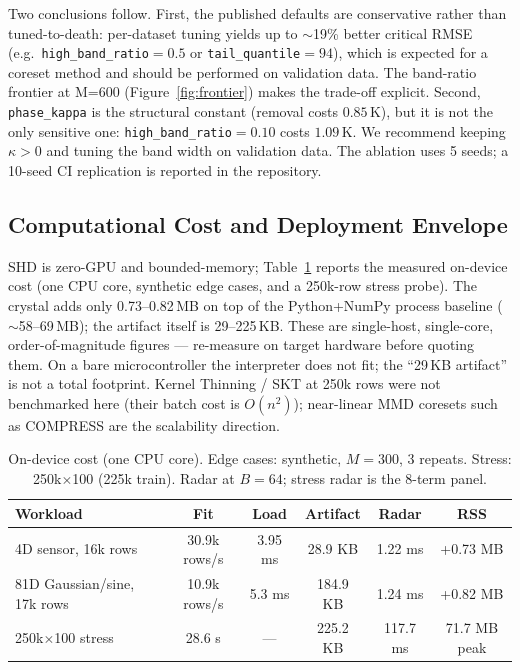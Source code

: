 \documentclass[11pt,a4paper]{article}
\begin{document}
Two conclusions follow. First, the published defaults are conservative rather than
tuned-to-death: per-dataset tuning yields up to $\sim$19\% better critical RMSE
(e.g.\ \texttt{high\_band\_ratio}${=}0.5$ or \texttt{tail\_quantile}${=}94$), which
is expected for a coreset method and should be performed on validation data.
The band-ratio frontier at M=600 (Figure~\ref{fig:frontier}) makes the trade-off explicit.
Second, \texttt{phase\_kappa} is the structural constant (removal costs $0.85\,\mathrm{K}$), but it is not the only sensitive one: \texttt{high\_band\_ratio}$=0.10$ costs $1.09\,\mathrm{K}$. We recommend keeping $\kappa>0$ and tuning the band width on validation data. The ablation uses 5 seeds; a 10-seed CI replication is reported in the repository.

\subsection{Computational Cost and Deployment Envelope}
\label{sec:cost}
SHD is zero-GPU and bounded-memory; Table~\ref{tab:cost} reports the measured on-device cost (one CPU core, synthetic edge cases, and a 250k-row stress probe). The crystal adds only 0.73--0.82\,MB on top of the Python+NumPy process baseline ($\sim$58--69\,MB); the artifact itself is 29--225\,KB. These are single-host, single-core, order-of-magnitude figures --- re-measure on target hardware before quoting them. On a bare microcontroller the interpreter does not fit; the ``29\,KB artifact'' is not a total footprint. Kernel Thinning / SKT at 250k rows were not benchmarked here (their batch cost is $O(n^2)$); near-linear MMD coresets such as COMPRESS \citep{shetty2021compress} are the scalability direction.

\begin{table}[t]
\centering
\small
\caption{On-device cost (one CPU core). Edge cases: synthetic, $M=300$, 3 repeats. Stress: 250k$\times$100 (225k train). Radar at $B=64$; stress radar is the 8-term panel.}
\label{tab:cost}
\begin{tabular}{lccccc}
\toprule
\textbf{Workload} & \textbf{Fit} & \textbf{Load} & \textbf{Artifact} & \textbf{Radar} & \textbf{RSS} \\
\midrule
4D sensor, 16k rows & 30.9k rows/s & 3.95 ms & 28.9 KB & 1.22 ms & +0.73 MB \\
81D Gaussian/sine, 17k rows & 10.9k rows/s & 5.3 ms & 184.9 KB & 1.24 ms & +0.82 MB \\
250k$\times$100 stress & 28.6 s & --- & 225.2 KB & 117.7 ms & 71.7 MB peak \\
\bottomrule
\end{tabular}
\end{table}
\end{document}
